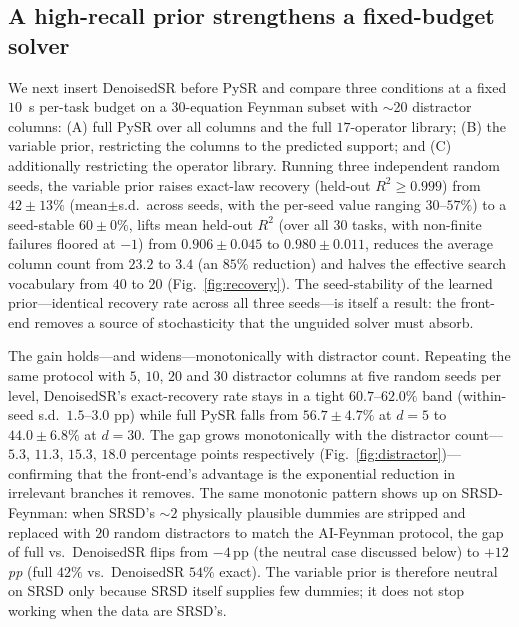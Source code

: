 \documentclass[11pt]{article}
\begin{document}
\subsection*{A high-recall prior strengthens a fixed-budget solver}
We next insert DenoisedSR before PySR\cite{cranmer2023pysr} and compare three
conditions at a fixed $10$~s per-task budget on a $30$-equation Feynman subset
with $\sim$20 distractor columns: (A) full PySR over all columns and the full
$17$-operator library; (B) the variable prior, restricting the columns to the
predicted support; and (C) additionally restricting the operator library. Running
three independent random seeds, the variable prior raises exact-law recovery
(held-out $R^2\ge0.999$) from $42{\pm}13\%$ (mean${\pm}$s.d.\ across seeds, with
the per-seed value ranging $30$--$57\%$) to a seed-stable $60{\pm}0\%$, lifts
mean held-out $R^2$ (over all $30$ tasks, with non-finite failures floored at
$-1$) from $0.906{\pm}0.045$ to $0.980{\pm}0.011$, reduces the average column
count from $23.2$ to $3.4$ (an $85\%$ reduction) and halves the effective search
vocabulary from $40$ to $20$ (Fig.~\ref{fig:recovery}). The seed-stability of the
learned prior---identical recovery rate across all three seeds---is itself a
result: the front-end removes a source of stochasticity that the unguided solver
must absorb.

The gain holds---and widens---monotonically with distractor count. Repeating
the same protocol with $5$, $10$, $20$ and $30$ distractor columns at five
random seeds per level, DenoisedSR's exact-recovery rate stays in a tight
$60.7$--$62.0\%$ band (within-seed s.d.\ $1.5$--$3.0$ pp) while full PySR
falls from $56.7{\pm}4.7\%$ at $d{=}5$ to $44.0{\pm}6.8\%$ at $d{=}30$. The
gap grows monotonically with the distractor count---$5.3$, $11.3$, $15.3$,
$18.0$ percentage points respectively (Fig.~\ref{fig:distractor})---confirming
that the front-end's advantage is the exponential reduction in irrelevant
branches it removes. The same monotonic pattern shows up on SRSD-Feynman: when
SRSD's $\sim$$2$ physically plausible dummies are stripped and replaced with
$20$ random distractors to match the AI-Feynman protocol, the gap of full vs.\
DenoisedSR flips from $-4$\,pp (the neutral case discussed below) to
\emph{$+12$\,pp} (full $42\%$ vs.\ DenoisedSR $54\%$ exact). The variable
prior is therefore neutral on SRSD only because SRSD itself supplies few
dummies; it does not stop working when the data are SRSD's.
\end{document}
